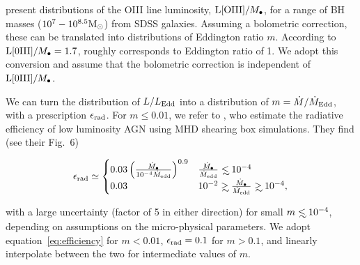 \documentclass[usenatbib,fleqn]{mnras}
\newcommand\lsim{\mathrel{\rlap{\lower4pt\hbox{\hskip1pt$\sim$}}
    \raise1pt\hbox{$<$}}}
\newcommand\gsim{\mathrel{\rlap{\lower4pt\hbox{\hskip1pt$\sim$}}
    \raise1pt\hbox{$>$}}}
\newcommand{\Mbh}[1][]{M_{\bullet#1}}
\newcommand{\Msun}{{\rm M_\odot}}
\begin{document}
\citet{Kauffmann&Heckman2009} present distributions of the OIII line
luminosity, ${\rm L[OIII]}/\Mbh$, for a range of BH masses
($10^7-10^{8.5} \Msun$) from SDSS galaxies.  Assuming a bolometric
correction, these can be translated into distributions of Eddington
ratio $m$.  According to \citet{Kauffmann&Heckman2009} ${\rm
  L[0III]}/\Mbh=1.7$, roughly corresponds to Eddington ratio of 1. We
adopt this conversion and assume that the bolometric correction is
independent of ${\rm L[0III]}/\Mbh$. 

We can turn the distribution of $L/L_{\rm Edd}$ into a distribution of
$m=\dot{M}/\dot{M}_{\rm Edd}$, with a prescription $\epsilon_{\rm
  rad}$.  For $m \leq 0.01$, we refer to \citet{Sharma+2007}, who
estimate the radiative efficiency of low luminosity AGN using MHD
shearing box simulations.  They find (see their Fig.~6)

\begin{align}
\epsilon_{\rm rad} \simeq 
\begin{cases}
  0.03 \left(\frac{\dot{M}_{\bullet}}{10^{-4}\dot{M}_{\rm edd}}\right)^{0.9} & \frac{\dot{M}_{\bullet}}{\dot{M}_{\rm edd}} \lsim 10^{-4} \\
 0.03 &  10^{-2} \gsim \frac{\dot{M}_{\bullet}}{\dot{M}_{\rm edd}} \gsim  10^{-4},
\end{cases}
\label{eq:efficiency}
\end{align}


with a large uncertainty (factor of 5 in either direction) for small
$m\lsim 10^{-4}$, depending on assumptions on the micro-physical
parameters. We adopt equation~\eqref{eq:efficiency} for $m <0.01$,
$\epsilon_{\rm rad}=0.1$ for $m>0.1$, and linearly interpolate between
the two for intermediate values of $m$.
\end{document}

